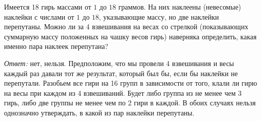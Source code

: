 \problem
Имеется 18 гирь массами от $1$ до $18$ граммов.
На них наклеены (невесомые) наклейки с числами от $1$ до $18$, указывающие
массу, но две наклейки перепутаны.
Можно ли за 4 взвешивания на весах со стрелкой
(показывающих суммарную массу положенных на чашку весов гирь)
наверняка определить, какая именно пара наклеек перепутана?

\solution
\emph{Ответ:} нет, нельзя.
Предположим, что мы провели 4 взвешивания и весы каждый раз давали тот же
результат, который был бы, если бы наклейки не перепутали.
Разобьем все гири на 16 групп в зависимости от того, клали ли гирю на весы при
каждом из 4 взвешиваний.
Будет либо группа из не менее чем 3 гирь, либо две группы не менее чем по 2
гири в каждой.
В обоих случаях нельзя однозначно утверждать, в какой из пар наклейки
перепутаны.

\endproblem
